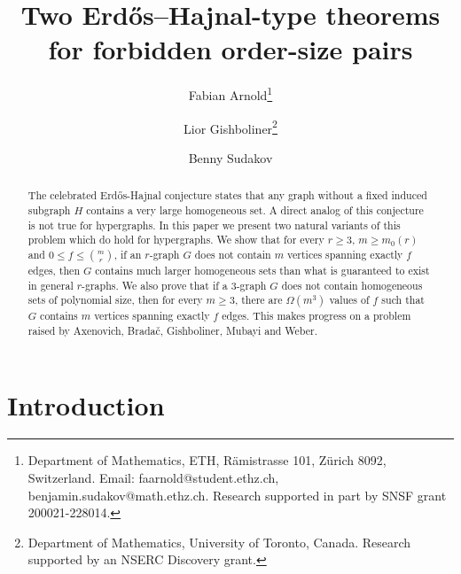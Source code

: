 \documentclass[11pt]{article}
\title{\vspace{-0.9cm} Two Erd\H{o}s--Hajnal-type theorems for forbidden order-size pairs}
\author{
Fabian Arnold\thanks{Department of Mathematics, ETH, R\"amistrasse 101, Z\"urich 8092, Switzerland.  Email: faarnold@student.ethz.ch, benjamin.sudakov@math.ethz.ch. 
Research supported in part by SNSF grant 200021-228014.} \and
Lior Gishboliner\thanks{Department of Mathematics, University of Toronto, Canada. Research supported by an NSERC Discovery grant.}
\and Benny Sudakov\footnotemark[1]
}
\date{}
\theoremstyle{plain}
\begin{document}
\maketitle

\begin{abstract}
The celebrated Erd\H{o}s-Hajnal conjecture states that any graph without a fixed induced subgraph $H$ contains a very large homogeneous set. A direct analog of this conjecture is not true for hypergraphs. In this paper we present two natural variants of this problem which do hold for hypergraphs. We show that for every $r \geq 3$, $m \geq m_0(r)$ and $0 \leq f \leq \binom{m}{r}$, if an $r$-graph $G$ does not contain $m$ vertices spanning exactly $f$ edges, then $G$ contains much larger homogeneous sets than what is guaranteed to exist in general $r$-graphs. We also prove that if a $3$-graph $G$ does not contain homogeneous sets of polynomial size, then for every $m \geq 3$, there are $\Omega(m^3)$ values of $f$ such that $G$ contains $m$ vertices spanning exactly $f$ edges. This makes progress on a problem raised by Axenovich, Brada\v{c}, Gishboliner, Mubayi and Weber.  
\end{abstract}

\section{Introduction}
\end{document}
